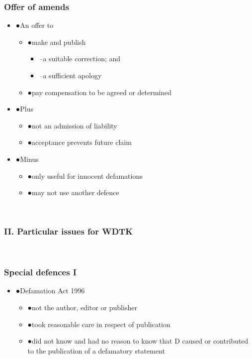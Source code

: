 \documentclass[ignorenonframetext,]{beamer}
\begin{document}
\begin{frame}
\frametitle{Offer of amends}

\begin{itemize}
\item  {●}An offer to

  \begin{itemize}
  \item    {●}make and publish

    \begin{itemize}
    \item      {--}a suitable correction; and
    \item      {--}a sufficient apology
    \end{itemize}
  \item    {●}{pay }{compensation to be agreed or determined}
  \end{itemize}
\item  {●}{Plus}

  \begin{itemize}
  \item    {●}{not an admission of liability}
  \item    {●}{acceptance prevents future claim}
  \end{itemize}
\item  {●}{Minus}

  \begin{itemize}
  \item    {●}{only useful for innocent defamations}
  \item    {●}{may not use another defence}
  \end{itemize}
\end{itemize}

~


\end{frame}

\begin{frame}
\frametitle{II. Particular issues for WDTK}

~


\end{frame}

\begin{frame}
\frametitle{Special defences I}

\begin{itemize}
\item  {●}Defamation Act 1996

  \begin{itemize}
  \item    {●}not the author, editor or publisher
  \item    {●}took reasonable care in respect of publication
  \item    {●}did not know and had no reason to know that D caused or
    contributed to the publication of a defamatory statement
  \end{itemize}
\end{itemize}

~


\end{frame}
\end{document}
